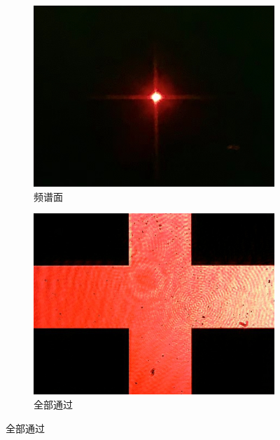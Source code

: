 \documentclass[a4paper]{article}
\begin{document}
\begin{figure}[H]
    \centering
    \begin{subfigure}[t]{0.3\textwidth}
        \centering
        \includegraphics[width=\textwidth]{phone-img/4.jpg}
        \caption{频谱面}
        \label{fig7-0}
    \end{subfigure}
    \begin{subfigure}[t]{0.3\textwidth}
        \centering
        \includegraphics[width=\textwidth]{img2-done/6-1.JPG}
        \caption{全部通过}
        \label{fig7-1}

\end{subfigure}
\end{figure}
\end{document}
